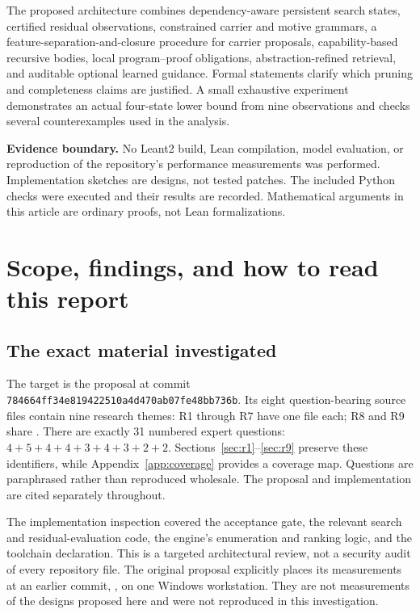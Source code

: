 \documentclass[11pt,a4paper]{article}
\newcommand{\code}[1]{\texttt{\detokenize{#1}}}
\newcommand{\repoSHA}{\texttt{784664ff34e819422510a4d470ab07fe48bb736b}}
\theoremstyle{definition}
\theoremstyle{remark}
\begin{document}
\begin{titlepage}
The proposed architecture combines dependency-aware persistent search states, certified residual observations, constrained carrier and motive grammars, a feature-separation-and-closure procedure for carrier proposals, capability-based recursive bodies, local program--proof obligations, abstraction-refined retrieval, and auditable optional learned guidance. Formal statements clarify which pruning and completeness claims are justified. A small exhaustive experiment demonstrates an actual four-state lower bound from nine observations and checks several counterexamples used in the analysis.

\vfill
\small\textbf{Evidence boundary.} No Leant2 build, Lean compilation, model evaluation, or reproduction of the repository's performance measurements was performed. Implementation sketches are designs, not tested patches. The included Python checks were executed and their results are recorded. Mathematical arguments in this article are ordinary proofs, not Lean formalizations.
\end{titlepage}

\tableofcontents
\clearpage

\section{Scope, findings, and how to read this report}\label{sec:scope}

\subsection{The exact material investigated}

The target is the proposal at commit \repoSHA. Its eight question-bearing source files contain nine research themes: R1 through R7 have one file each; R8 and R9 share . There are exactly 31 numbered expert questions: $4+5+4+4+3+4+3+2+2$. Sections~\ref{sec:r1}--\ref{sec:r9} preserve these identifiers, while Appendix~\ref{app:coverage} provides a coverage map. Questions are paraphrased rather than reproduced wholesale. The proposal and implementation are cited separately throughout.\cite{repo,proposal,repo-r1,repo-r2,repo-r3,repo-r4,repo-r5,repo-r6,repo-r7,repo-r89}

The implementation inspection covered the acceptance gate, the relevant search and residual-evaluation code, the engine's enumeration and ranking logic, and the toolchain declaration. This is a targeted architectural review, not a security audit of every repository file. The original proposal explicitly places its measurements at an earlier commit, \code{33cec8b}, on one Windows workstation. They are not measurements of the designs proposed here and were not reproduced in this investigation.\cite{proposal,repo-gate,repo-search,repo-engine,repo-toolchain}
\end{document}
